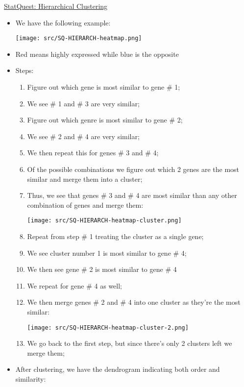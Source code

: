 \documentclass[12pt, titlepage, french]{report}
\begin{document}
\begin{YTB_SUMM}{\href{https://www.youtube.com/watch?v=7xHsRkOdVwo&list=PLblh5JKOoLUICTaGLRoHQDuF_7q2GfuJF&index=31}{StatQuest: Hierarchical Clustering}}
\begin{itemize}
	\item	We have the following example:
	
	\texttt{[image: src/SQ-HIERARCH-heatmap.png]}
	\item[]	Red means highly expressed while blue is the opposite
	\item	Steps:
		\begin{enumerate}
		\item	Figure out which gene is most similar to gene \# 1;
		\item[]	We see \# 1 and \# 3 are very similar;
		\item	Figure out which genre is most similar to gene \# 2;
		\item[]	We see \# 2 and \# 4 are very similar;
		\item[]	We then repeat this for genes \# 3 and \# 4;
		\item	Of the possible combinations we figure out which 2 genes are the most similar and merge them into a cluster;
		\item[]	Thus, we see that genes \# 3 and \# 4 are most similar than any other combination of genes and merge them:
		
		\texttt{[image: src/SQ-HIERARCH-heatmap-cluster.png]}
		\item	Repeat from step \# 1 treating the cluster as a single gene;
		\item[]	We see cluster number 1 is most similar to gene \# 4;
		\item	We then see gene \# 2 is most similar to gene \# 4 
		\item[]	We repeat for gene \# 4 as well;
		\item	We then merge genes \# 2 and \# 4 into one cluster as they're the most similar:
		
		\texttt{[image: src/SQ-HIERARCH-heatmap-cluster-2.png]}
		\item	We go back to the first step, but since there's only 2 clusters left we merge them;
		\end{enumerate}
	\item	After clustering, we have the dendrogram indicating both order and similarity:
	

\end{itemize}
\end{YTB_SUMM}
\end{document}
